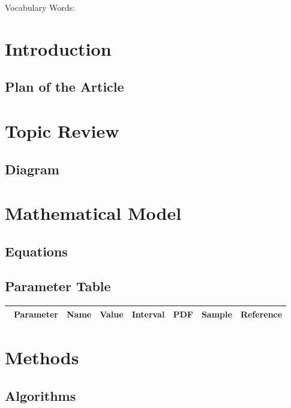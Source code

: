 
Vocabulary Words:

\section{Introduction}

\subsection{Plan of the Article}

\section{Topic Review}

\subsection{Diagram}

\section{Mathematical Model}

\subsection{Equations}

\subsection{Parameter Table}

\begin{table}[H]\centering
\begin{tabular}{p{1cm}p{1cm}p{1cm}p{1cm}p{1cm}p{1cm}p{4cm}}\
Parameter & Name & Value & Interval & PDF & Sample & Reference \\
\hline
\hline
\end{tabular}
\end{table}

\section{Methods}

\subsection{Algorithms}

